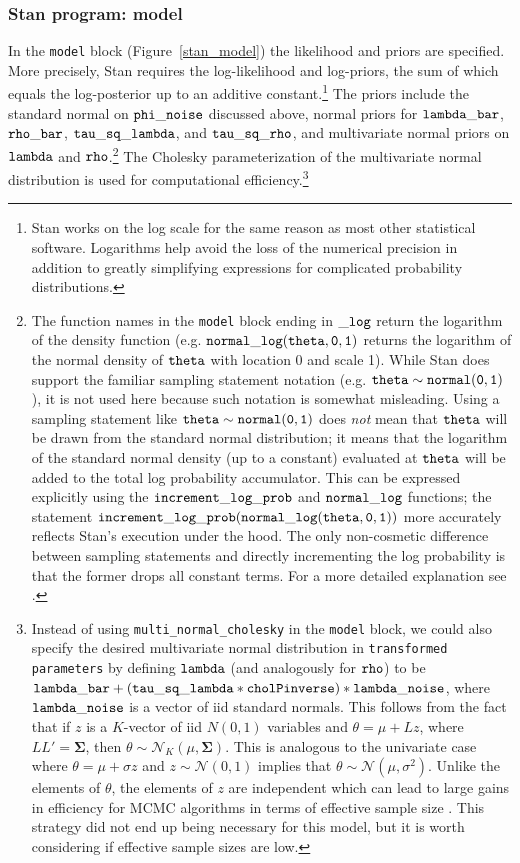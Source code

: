 \subsubsection{Stan program: model}

In the {\tt model} block (Figure~\ref{stan_model}) the likelihood and priors are specified. More precisely, Stan requires the log-likelihood and log-priors, the sum of which equals the log-posterior up to an additive constant.\footnote{Stan works on the log scale for the same reason as most other statistical software. Logarithms help avoid the loss of the numerical precision in addition to greatly simplifying expressions for complicated probability distributions.}
The priors include the standard normal on ${\tt phi\_noise}$ discussed above, normal priors for ${\tt lambda\_bar}$, ${\tt rho\_bar}$, ${\tt tau\_sq\_lambda}$, and ${\tt tau\_sq\_rho}$, and multivariate normal priors on ${\tt lambda}$ and ${\tt rho}$.\footnote{The function names in the {\tt model} block ending in ${\tt\_log}$ return the logarithm of the density function (e.g. ${\tt normal\_log(theta,0,1)}$ returns the logarithm of the normal density of ${\tt theta}$  with location 0 and scale 1). While Stan does support the familiar sampling statement notation (e.g. ${\tt theta \sim normal(0,1)}$), it is not used here because such notation is somewhat misleading. Using a sampling statement like ${\tt theta \sim normal(0,1)}$ does {\it not} mean that ${\tt theta}$ will be drawn from the standard normal distribution; it means that the logarithm of the standard normal density (up to a constant) evaluated at ${\tt theta}$ will be added to the total log probability accumulator. This can be expressed explicitly using the ${\tt increment\_log\_prob}$ and ${\tt normal\_log}$ functions; the statement ${\tt increment\_log\_prob(normal\_log(theta,0,1))}$ more accurately reflects Stan's execution under the hood. The only non-cosmetic difference between sampling statements and directly incrementing the log probability is that the former drops all constant terms. For a more detailed explanation see .} The Cholesky parameterization of the multivariate normal distribution is used for computational efficiency.\footnote{Instead of using {\tt multi\_normal\_cholesky} in the {\tt model} block, we could also specify the desired multivariate normal distribution in {\tt transformed parameters} by defining ${\tt lambda}$ (and analogously for ${\tt rho}$) to be  ${\tt lambda\_bar + (tau\_sq\_lambda * cholPinverse) * lambda\_noise}$, where ${\tt lambda\_noise}$ is a vector of iid standard normals. This follows from the fact that if $z$ is a $K$-vector of iid $N(0,1)$ variables and $\theta = \mu + L z$, where $LL' = \boldsymbol{\Sigma}$, then $\theta \sim \mathcal{N}_K (\mu, \boldsymbol{\Sigma})$. This is analogous to the univariate case where $\theta = \mu + \sigma z$ and $z \sim \mathcal{N}(0,1)$ implies that $\theta \sim \mathcal{N}(\mu, \sigma^2)$. Unlike the elements of $\theta$, the elements of $z$ are independent which can lead to large gains in efficiency for MCMC algorithms in terms of effective sample size . This strategy did not end up being necessary for this model, but it is worth considering if effective sample sizes are low.} 

